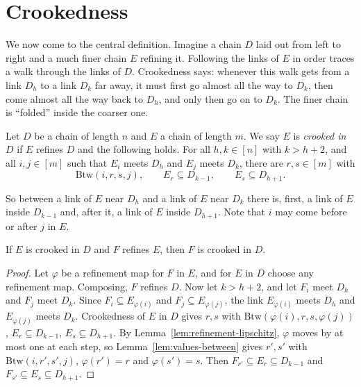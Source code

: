 
\section{Crookedness}

We now come to the central definition. Imagine a chain $D$ laid out from left to right and a
much finer chain $E$ refining it. Following the links of $E$ in order traces a walk through
the links of $D$. Crookedness says: whenever this walk gets from a link $D_h$ to a link $D_k$
far away, it must first go almost all the way to $D_k$, then come almost all the way back to
$D_h$, and only then go on to $D_k$. The finer chain is ``folded'' inside the coarser one.

\begin{definition}[Crookedness]\label{def:crooked}
Let $D$ be a chain of length $n$ and $E$ a chain of length $m$. We say $E$ is \emph{crooked
in} $D$ if $E$ refines $D$ and the following holds. For all $h,k\in[n]$ with $k>h+2$, and all
$i,j\in[m]$ such that $E_i$ meets $D_h$ and $E_j$ meets $D_k$, there are $r,s\in[m]$ with
\[
\mathrm{Btw}(i,r,s,j),\qquad E_r\subseteq D_{k-1},\qquad E_s\subseteq D_{h+1}.
\]
\end{definition}

So between a link of $E$ near $D_h$ and a link of $E$ near $D_k$ there is, first, a link of $E$
inside $D_{k-1}$ and, after it, a link of $E$ inside $D_{h+1}$. Note that $i$ may come before or
after $j$ in $E$.


\begin{lemma}\label{lem:crooked-refine}
If $E$ is crooked in $D$ and $F$ refines $E$, then $F$ is crooked in $D$.
\end{lemma}

\begin{proof}
Let $\varphi$ be a refinement map for $F$ in $E$, and for $E$ in $D$ choose any refinement
map. Composing, $F$ refines $D$. Now let $k>h+2$, and let $F_i$ meet $D_h$ and $F_j$ meet
$D_k$. Since $F_i\subseteq E_{\varphi(i)}$ and $F_j\subseteq E_{\varphi(j)}$, the link
$E_{\varphi(i)}$ meets $D_h$ and $E_{\varphi(j)}$ meets $D_k$. Crookedness of $E$ in $D$ gives
$r,s$ with $\mathrm{Btw}(\varphi(i),r,s,\varphi(j))$, $E_r\subseteq D_{k-1}$, $E_s\subseteq
D_{h+1}$. By Lemma~\ref{lem:refinement-lipschitz}, $\varphi$ moves by at most one at each step,
so Lemma~\ref{lem:values-between} gives $r',s'$ with $\mathrm{Btw}(i,r',s',j)$, $\varphi(r')=r$
and $\varphi(s')=s$. Then $F_{r'}\subseteq E_r\subseteq D_{k-1}$ and $F_{s'}\subseteq
E_s\subseteq D_{h+1}$.
\end{proof}

